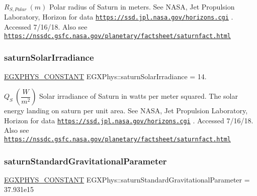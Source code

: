 $R_{S,Polar} \ (m)$ Polar radius of Saturn in meters. See N\+A\+SA, Jet Propulsion Laboratory, Horizon for data \href{https://ssd.jpl.nasa.gov/horizons.cgi}{\tt https\+://ssd.\+jpl.\+nasa.\+gov/horizons.\+cgi} . Accessed 7/16/18. Also see \href{https://nssdc.gsfc.nasa.gov/planetary/factsheet/saturnfact.html}{\tt https\+://nssdc.\+gsfc.\+nasa.\+gov/planetary/factsheet/saturnfact.\+html} \mbox{\label{group___e_g_x_phys-_constants-_astrophysics-_solar_system-_saturn-_bulk_ga3a3e3302f9786d2172ec1121b4251c57}} 
\subsubsection{\texorpdfstring{saturn\+Solar\+Irradiance}{saturnSolarIrradiance}}
{\footnotesize\ttfamily \mbox{\hyperlink{group___e_g_x_phys-_constants-_macros_ga76980d288494ce1714c9ac68a95ba702}{E\+G\+X\+P\+H\+Y\+S\+\_\+\+C\+O\+N\+S\+T\+A\+NT}} E\+G\+X\+Phys\+::saturn\+Solar\+Irradiance = 14.}

$ Q_{S} \ (\dfrac{W}{m^2})$ Solar irradiance of Saturn in watts per meter squared. The solar energy landing on saturn per unit area. See N\+A\+SA, Jet Propulsion Laboratory, Horizon for data \href{https://ssd.jpl.nasa.gov/horizons.cgi}{\tt https\+://ssd.\+jpl.\+nasa.\+gov/horizons.\+cgi} . Accessed 7/16/18. Also see \href{https://nssdc.gsfc.nasa.gov/planetary/factsheet/saturnfact.html}{\tt https\+://nssdc.\+gsfc.\+nasa.\+gov/planetary/factsheet/saturnfact.\+html} \mbox{\label{group___e_g_x_phys-_constants-_astrophysics-_solar_system-_saturn-_bulk_ga290a47817afd6772a4e2a27caab6ee02}} 
\subsubsection{\texorpdfstring{saturn\+Standard\+Gravitational\+Parameter}{saturnStandardGravitationalParameter}}
{\footnotesize\ttfamily \mbox{\hyperlink{group___e_g_x_phys-_constants-_macros_ga76980d288494ce1714c9ac68a95ba702}{E\+G\+X\+P\+H\+Y\+S\+\_\+\+C\+O\+N\+S\+T\+A\+NT}} E\+G\+X\+Phys\+::saturn\+Standard\+Gravitational\+Parameter = 37.\+931e15}

